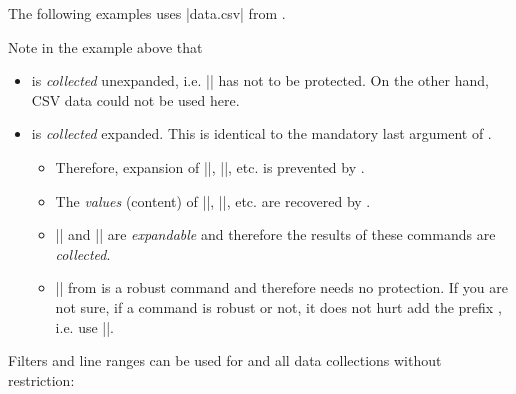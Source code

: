 \documentclass[a4paper,11pt]{ltxdoc}
\begin{document}
The following examples uses |data.csv| from .

\begin{dispExample}
\end{dispExample}

Note in the example above that
\begin{itemize}
\item {} is \emph{collected} unexpanded, i.e.
  |\SetCell| has not to be protected. On the other hand, CSV data could not
  be used here.
\item {} is \emph{collected} expanded. This is identical
  to the mandatory last argument of .
  \begin{itemize}
  \item Therefore, expansion of |\SetRow|, |\SetCell|, etc. is prevented by .
  \item The \emph{values} (content) of |\land|, |\group|, etc. are recovered by
        .
  \item |\IfCsvsimStrEqualTF| and |\fpeval| are \emph{expandable} and therefore the
    results of these commands are \emph{collected}.
  \item |\tablenum| from  is a robust command and therefore
    needs no protection. If you are not sure, if a command is robust or not, it
    does not hurt add the prefix , i.e. use |\csvexpnot\tablenum|.
  \end{itemize}
\end{itemize}

\clearpage

Filters and line ranges can be used for  and all
data collections without restriction:
\end{document}
